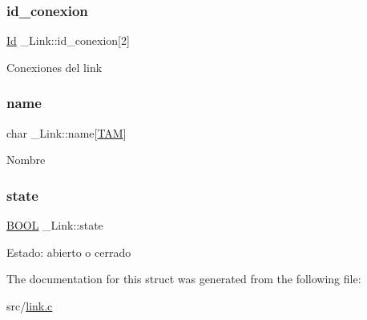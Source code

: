 \subsubsection{\texorpdfstring{id\+\_\+conexion}{id\_conexion}}
{\footnotesize\ttfamily \hyperlink{types_8h_a845e604fb28f7e3d97549da3448149d3}{Id} \+\_\+\+Link\+::id\+\_\+conexion\mbox{[}2\mbox{]}}

Conexiones del link \mbox{\label{struct__Link_a5d81b67643f9c41056d8b199adbed77d}} 
\subsubsection{\texorpdfstring{name}{name}}
{\footnotesize\ttfamily char \+\_\+\+Link\+::name\mbox{[}\hyperlink{types_8h_ae0b4816fb45161ef9da5e6d6134ee28a}{T\+AM}\mbox{]}}

Nombre \mbox{\label{struct__Link_a82cc94a1764a428c2eaaa6ef60fb3949}} 
\subsubsection{\texorpdfstring{state}{state}}
{\footnotesize\ttfamily \hyperlink{types_8h_a3e5b8192e7d9ffaf3542f1210aec18dd}{B\+O\+OL} \+\_\+\+Link\+::state}

Estado\+: abierto o cerrado 

The documentation for this struct was generated from the following file\+:\begin{DoxyCompactItemize}
\item 
src/\hyperlink{link_8c}{link.\+c}\end{DoxyCompactItemize}
